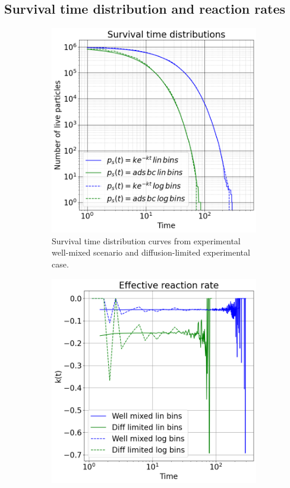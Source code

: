 \documentclass{article}
\begin{document}
\subsection{Survival time distribution and reaction rates}
\begin{figure}[htbp]
    \centering
    \begin{subfigure}[b]{0.45\textwidth}
        \centering
        \includegraphics[width=\textwidth]{images/survTimeDistCompare.png}
        \caption{Survival time distribution curves from experimental well-mixed scenario and diffusion-limited experimental case.}
    \end{subfigure}
    \hfill
    \begin{subfigure}[b]{0.45\textwidth}
        \centering
        \includegraphics[width=\textwidth]{images/compareDecayDegradationRates.png}

\end{subfigure}
\end{figure}
\end{document}
